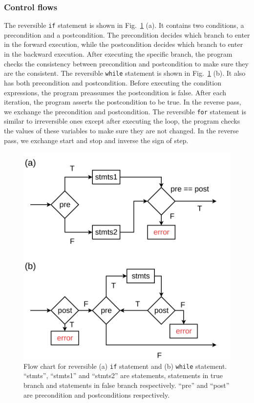 \documentclass[aps,twocolumn,longbibliography,english,superscriptaddress]{revtex4-1}
\newcommand{\<}{\langle}
\renewcommand{\>}{\rangle}
\newcommand{\Fig}[1]{Fig.~\ref{#1}}
\theoremstyle{definition}\newtheorem{definition}{\textit{Definition}}
\begin{document}
\subsubsection{Control flows}
The reversible \texttt{if} statement is shown in \Fig{fig:controlflow} (a). It contains two conditions, a precondition and a postcondition. The precondition decides which branch to enter in the forward execution, while the postcondition decides which branch to enter in the backward execution. After executing the specific branch, the program checks the consistency between precondition and postcondition to make sure they are the consistent.
The reversible \texttt{while} statement is shown in \Fig{fig:controlflow} (b). It also has both precondition and postcondition. Before executing the condition expressions, the program preassumes the postcondition is false.
After each iteration, the program asserts the postcondition to be true. In the reverse pass, we exchange the precondition and postcondition.
The reversible \texttt{for} statement is similar to irreversible ones except after executing the loop, the program checks the values of these variables to make sure they are not changed. In the reverse pass, we exchange start and stop and inverse the sign of step.
\begin{figure}
    \centerline{\includegraphics[width=0.8\columnwidth,trim={0 0cm 0 0cm},clip]{images/controlflow.pdf}}
    \caption{Flow chart for reversible (a) \texttt{if} statement and (b) \texttt{while} statement. ``stmts'', ``stmts1'' and ``stmts2'' are statements, statements in true branch and statements in false branch respectively. ``pre'' and ``post'' are precondition and postconditions respectively.}\label{fig:controlflow}
\end{figure}
\end{document}
